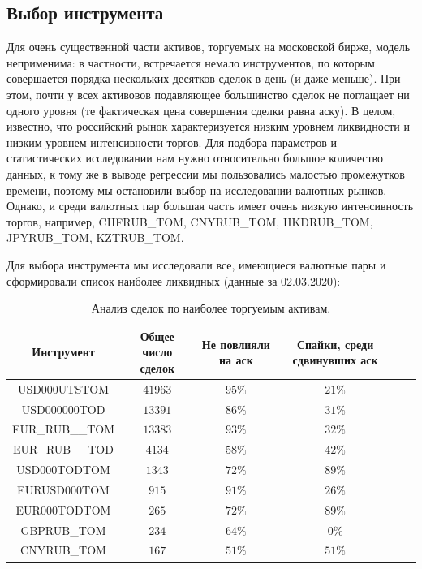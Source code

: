 \subsection{Выбор инструмента}

Для очень существенной части активов, торгуемых на московской бирже, модель неприменима: в частности,
встречается немало инструментов, по которым совершается порядка нескольких десятков сделок в день (и даже меньше). При этом, почти у всех активовов подавляющее
большинство сделок не поглащает ни одного уровня (те фактическая цена совершения сделки равна аску). В целом, известно, что российский рынок 
характеризуется низким уровнем ликвидности и низким уровнем интенсивности торгов. 
Для подбора параметров и статистических исследовании
нам нужно относительно большое количество данных, к тому же в выводе регрессии мы пользовались малостью промежутков времени, 
поэтому мы остановили выбор на исследовании валютных рынков.
Однако, и среди валютных пар большая часть имеет очень низкую интенсивность торгов, например, CHFRUB\_TOM, CNYRUB\_TOM, HKDRUB\_TOM, 
JPYRUB\_TOM, KZTRUB\_TOM. \par
Для выбора инструмента мы исследовали все, имеющиеся валютные пары и сформировали список наиболее ликвидных (данные за 02.03.2020):

\begin{table}[h!]
    \begin{center}
        \begin{tabular}{|c|c|c|c|c|c|}
            \hline
        Инструмент        & Общее число сделок & Не повлияли на аск & Спайки, среди сдвинувших аск \\ \hline
        USD000UTSTOM      & $41963$ & $95\%$ & $21\%$ \\ \hline
        USD000000TOD      & $13391$ & $86\%$ & $31\%$ \\ \hline
        EUR\_RUB\_\_TOM   & $13383$ & $93\%$ & $32\%$ \\ \hline
        EUR\_RUB\_\_TOD   & $4134 $ & $58\%$ & $42\%$ \\ \hline
        USD000TODTOM      & $1343 $ & $72\%$ & $89\%$ \\ \hline
        EURUSD000TOM      & $915  $ & $91\%$ & $26\%$ \\ \hline
        EUR000TODTOM      & $265  $ & $72\%$ & $89\%$ \\ \hline
        GBPRUB\_TOM       & $234  $ & $64\%$ & $ 0\%$ \\ \hline
        CNYRUB\_TOM       & $167  $ & $51\%$ & $51\%$ \\ \hline
        \end{tabular}
    \end{center}
    \label{tableanalCU}
    \caption{Анализ сделок по наиболее торгуемым активам.}
\end{table} 

